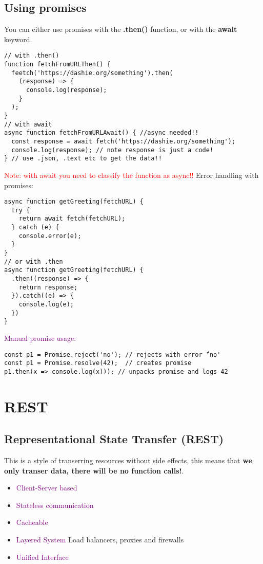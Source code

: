\documentclass[main.tex,fontsize=6pt,paper=a4,paper=landscape,DIV=calc,]{scrartcl}
\begin{document}
\begin{multicols*}{4}
\subsection{Using promises}  
You can either use promises with the \textbf{.then()} function, or with the \textbf{await} keyword.
\vspace{-2mm}
\begin{lstlisting}
// with .then()
function fetchFromURLThen() {
  feetch('https://dashie.org/something').then(
    (response) => {
      console.log(response);
    }
  );
}
// with await
async function fetchFromURLAwait() { //async needed!!
  const response = await fetch('https://dashie.org/something');
  console.log(response); // note response is just a code!
} // use .json, .text etc to get the data!!
\end{lstlisting}
\vspace{2mm}
\textcolor{red}{Note: with await you need to classify the function as async!!}\newline
Error handling with promises:\newline 
\vspace{-2mm}
\begin{lstlisting}
async function getGreeting(fetchURL) {
  try { 
    return await fetch(fetchURL); 
  } catch (e) {
    console.error(e);
  }
}
// or with .then
async function getGreeting(fetchURL) {
  .then((response) => {
    return response; 
  }).catch((e) => {
    console.log(e);
  })
}
\end{lstlisting}
\vspace{2mm}
\textcolor{purple}{Manual promise usage:}
\vspace{-2mm}
\begin{lstlisting}
const p1 = Promise.reject('no'); // rejects with error ̈́'no'
const p1 = Promise.resolve(42);  // creates promise
p1.then(x => console.log(x))); // unpacks promise and logs 42
\end{lstlisting}
\vspace{2mm}

\section{REST}

\subsection{Representational State Transfer (REST)}  
This is a style of transerring resources without side effects, this means that \textbf{we only transer data, there will be no function calls!}.
\begin{itemize}
\item \textcolor{purple}{Client-Server based}
\item \textcolor{purple}{Stateless communication}
\item \textcolor{purple}{Cacheable}
\item \textcolor{purple}{Layered System} Load balancers, proxies and firewalls
\item \textcolor{purple}{Unified Interface}
\end{itemize} 


\end{multicols*}
\end{document}
